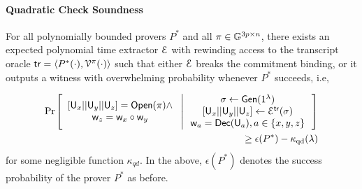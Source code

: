 
\paragraph*{Quadratic Check Soundness}
\begin{lemma}[Soundness]\label{lem:quadcheck_sound}
	For all polynomially bounded provers $P^\ast$ and all $\pi\in \mathbb{G}^{3p\times n}$,
	there exists an expected polynomial time extractor $\mathcal{E}$ with rewinding access
	to the transcript oracle $\mathsf{tr}=\langle P^\ast(\cdot),\mathcal{V}^{\pi}(\cdot)\rangle$
	such that either $\mathcal{E}$ breaks the commitment binding, or it outputs a witness
	with overwhelming probability whenever $P^\ast$ succeeds, i.e,
	
	{\footnotesize
		\begin{align*}
		\condprob{
			\begin{array}{c}
			{[}\ewit_x||\ewit_y||\ewit_z{]}=\open(\pi)\wedge \\
			\wit_z=\wit_x\circ\wit_y
			\end{array}
		}{
			\begin{array}{c}
			\sigma %
			\leftarrow \gen(\secparam) \\
			{[}\ewit_x||\ewit_y||\ewit_z{]}%
			\leftarrow \extr^{\mathsf{tr}}(\sigma) \\ 
			\wit_a=\dec(\ewit_a), a\in \{x,y,z\}
			\end{array}
		}\\
		\geq \epsilon(P^\ast) - \kappa_{\rm qd}(\secpar)
		\end{align*}
	}
	for some negligible function $\kappa_{qd}$. In the above, $\epsilon(P^\ast)$
	denotes the success probability of the prover $P^\ast$ as before.
\end{lemma}
